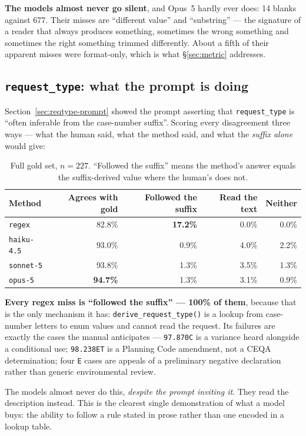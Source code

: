 \documentclass[11pt]{article}
\begin{document}
\textbf{The models almost never go silent}, and Opus~5 hardly ever does: 14 blanks against
677. Their misses are ``different value'' and ``substring'' --- the signature of a reader that
always produces something, sometimes the wrong something and sometimes the right something
trimmed differently. About a fifth of their apparent misses were format-only, which is what
\S\ref{sec:metric} addresses.

\subsection{\texttt{request\_type}: what the prompt is doing}
\label{sec:reqtype}

Section~\ref{sec:reqtype-prompt} showed the prompt asserting that \texttt{request\_type} is
``often inferable from the case-number suffix''. Scoring every disagreement three ways --- what
the human said, what the method said, and what the \emph{suffix alone} would give:

\begin{table}[h]
\centering
\begin{tabular}{lrrrr}
\toprule
Method & Agrees with gold & Followed the suffix & Read the text & Neither \\
\midrule
\texttt{regex}     & 82.8\% & \textbf{17.2\%} & 0.0\% & 0.0\% \\
\texttt{haiku-4.5} & 93.0\% & 0.9\% & 4.0\% & 2.2\% \\
\texttt{sonnet-5}  & 93.8\% & 1.3\% & 3.5\% & 1.3\% \\
\texttt{opus-5}    & \textbf{94.7\%} & 1.3\% & 3.1\% & 0.9\% \\
\bottomrule
\end{tabular}
\caption{Full gold set, $n=227$. ``Followed the suffix'' means the method's answer equals the
suffix-derived value where the human's does not.}
\end{table}

\textbf{Every regex miss is ``followed the suffix'' --- 100\% of them}, because that is the
only mechanism it has: \texttt{derive\_request\_type()} is a lookup from case-number letters
to enum values and cannot read the request. Its failures are exactly the cases the manual
anticipates --- \texttt{97.870C} is a variance heard alongside a conditional use;
\texttt{98.238ET} is a Planning Code amendment, not a CEQA determination; four \texttt{E}
cases are appeals of a preliminary negative declaration rather than generic environmental
review.

The models almost never do this, \emph{despite the prompt inviting it}. They read the
description instead. This is the clearest single demonstration of what a model buys: the
ability to follow a rule stated in prose rather than one encoded in a lookup table.
\end{document}
